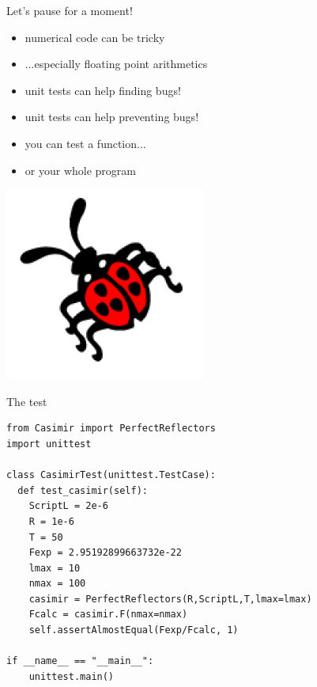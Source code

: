 \documentclass[12pt,compress,mathserif]{beamer}
\begin{document}
\begin{frame}{Let's pause for a moment!}
    \begin{itemize}
        \item numerical code can be tricky
        \item ...especially floating point arithmetics 
        \item unit tests can help finding bugs!
        \item unit tests can help preventing bugs!
        \vfill
        \item you can test a function...
        \item or your whole program
    \end{itemize}

    \vfill
    \hfill
    \includegraphics[scale=0.3]{bug.png}
\end{frame}

\begin{frame}[fragile]{The test}
\begin{lstlisting}
from Casimir import PerfectReflectors
import unittest

class CasimirTest(unittest.TestCase):
  def test_casimir(self):
    ScriptL = 2e-6
    R = 1e-6
    T = 50
    Fexp = 2.95192899663732e-22
    lmax = 10
    nmax = 100
    casimir = PerfectReflectors(R,ScriptL,T,lmax=lmax)
    Fcalc = casimir.F(nmax=nmax)
    self.assertAlmostEqual(Fexp/Fcalc, 1)

if __name__ == "__main__":
    unittest.main()
\end{lstlisting}
\end{frame}
\end{document}
